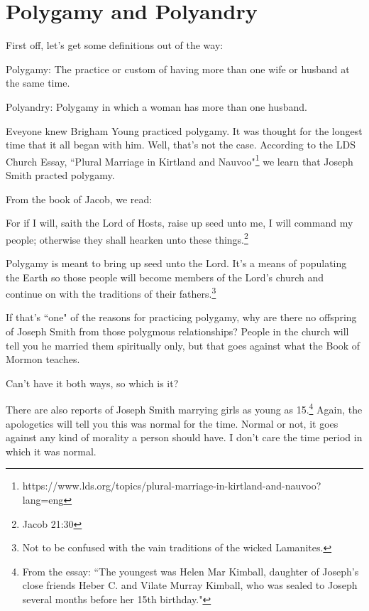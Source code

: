 \chapter{Polygamy and Polyandry}

First off, let's get some definitions out of the way:

\begin{displayquote}
Polygamy: The practice or custom of having more than one wife or husband at the same 
time.
\end{displayquote}

\begin{displayquote}
Polyandry: Polygamy in which a woman has more than one husband.
\end{displayquote}

Eveyone knew Brigham Young practiced polygamy. It was thought for the longest time 
that it all began with him. Well, that's not the case. According to the LDS Church
Essay, ``Plural Marriage in Kirtland and Nauvoo"\footnote{
https://www.lds.org/topics/plural-marriage-in-kirtland-and-nauvoo?lang=eng
} we learn that Joseph Smith practed polygamy.

From the book of Jacob, we read:

\begin{displayquote}
For if I will, saith the Lord of Hosts, raise up seed unto me, 
I will command my people; otherwise they shall hearken unto these 
things.\footnote{Jacob 21:30}
\end{displayquote}

Polygamy is meant to bring up seed unto the Lord. It's a means of populating the
Earth so those people will become members of the Lord's church and continue on with
the traditions of their fathers.\footnote{Not to be confused with the vain traditions
of the wicked Lamanites.}

If that's ``one" of the reasons for practicing polygamy, why are there no offspring
of Joseph Smith from those polygmous relationships? People in the church will tell
you he married them spiritually only, but that goes against what the Book of Mormon
teaches.

Can't have it both ways, so which is it?

There are also reports of Joseph Smith marrying girls as young as 15.\footnote{
From the essay: ``The youngest was Helen Mar Kimball, daughter of Joseph's close 
friends Heber C. and Vilate Murray Kimball, who was sealed to Joseph several 
months before her 15th birthday."
} Again, the apologetics will tell you this was normal for the time. Normal or not,
it goes against any kind of morality a person should have. I don't care the time
period in which it was normal.

